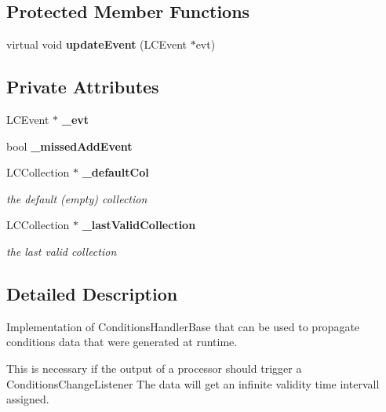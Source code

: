 \subsection*{Protected Member Functions}
\begin{DoxyCompactItemize}
\item 
virtual void {\bfseries update\-Event} (L\-C\-Event $\ast$evt)\label{classCALICE_1_1RunTimeConditionsHandler_a9e896232b8fa2153fd51524efb11c3a9}

\end{DoxyCompactItemize}
\subsection*{Private Attributes}
\begin{DoxyCompactItemize}
\item 
L\-C\-Event $\ast$ {\bfseries \-\_\-evt}\label{classCALICE_1_1RunTimeConditionsHandler_a0d779f9c8f24741a487848089cfbd9da}

\item 
bool {\bfseries \-\_\-missed\-Add\-Event}\label{classCALICE_1_1RunTimeConditionsHandler_ac1245dfab8ccb6a2464d7e9105da3326}

\item 
L\-C\-Collection $\ast$ {\bf \-\_\-default\-Col}\label{classCALICE_1_1RunTimeConditionsHandler_a9dc518975a177949967cca8853c14f3b}

\begin{DoxyCompactList}\small\item\em the default (empty) collection \end{DoxyCompactList}\item 
L\-C\-Collection $\ast$ {\bf \-\_\-last\-Valid\-Collection}\label{classCALICE_1_1RunTimeConditionsHandler_a1b2f0d346ce096596e7f703306d2f091}

\begin{DoxyCompactList}\small\item\em the last valid collection \end{DoxyCompactList}\end{DoxyCompactItemize}


\subsection{Detailed Description}
Implementation of Conditions\-Handler\-Base that can be used to propagate conditions data that were generated at runtime. 

This is necessary if the output of a processor should trigger a Conditions\-Change\-Listener The data will get an infinite validity time intervall assigned.\par



